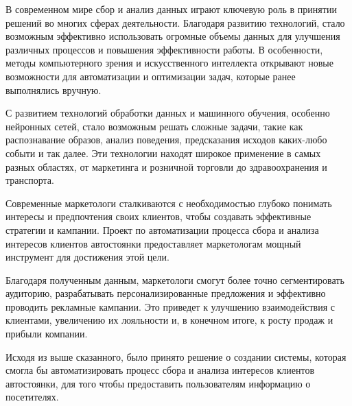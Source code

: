 

В современном мире сбор и анализ данных играют ключевую роль в принятии решений во многих сферах деятельности. 
Благодаря развитию технологий, стало возможным эффективно использовать огромные объемы данных для улучшения 
различных процессов и повышения эффективности работы. В особенности, методы компьютерного зрения и искусственного 
интеллекта открывают новые возможности для автоматизации и оптимизации задач, которые ранее выполнялись вручную.

С развитием технологий обработки данных и машинного обучения, особенно нейронных сетей, стало возможным решать 
сложные задачи, такие как распознавание образов, анализ поведения, предсказания исходов каких-любо событи и так далее. 
Эти технологии находят широкое применение в самых разных областях, от маркетинга и розничной 
торговли до здравоохранения и транспорта.

Современные маркетологи сталкиваются с необходимостью глубоко понимать интересы и предпочтения своих клиентов, чтобы создавать эффективные стратегии и кампании. Проект по автоматизации процесса сбора и анализа интересов клиентов автостоянки предоставляет маркетологам мощный инструмент для достижения этой цели.

Благодаря полученным данным, маркетологи смогут более точно сегментировать аудиторию, разрабатывать персонализированные предложения и эффективно проводить рекламные кампании. Это приведет к улучшению взаимодействия с клиентами, увеличению их лояльности и, в конечном итоге, к росту продаж и прибыли компании.

Исходя из выше сказанного, было принято решение о создании системы, которая смогла бы автоматизировать процесс сбора и 
анализа интересов клиентов автостоянки, для того чтобы предоставить пользователям информацию о посетителях.

\pagebreak
